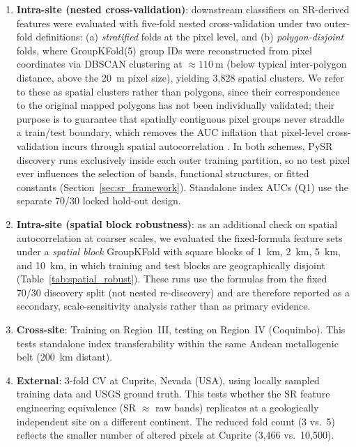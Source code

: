 \documentclass[preprint,authoryear,number]{elsarticle}
\begin{document}
\begin{enumerate}
  \item \textbf{Intra-site (nested cross-validation)}: downstream classifiers on SR-derived features were evaluated with five-fold nested cross-validation under two outer-fold definitions: (a) \emph{stratified} folds at the pixel level, and (b) \emph{polygon-disjoint} folds, where GroupKFold(5) group IDs were reconstructed from pixel coordinates via DBSCAN clustering at $\approx \SI{110}{\meter}$ (below typical inter-polygon distance, above the \SI{20}{\meter} pixel size), yielding 3{,}828 spatial clusters. We refer to these as spatial clusters rather than polygons, since their correspondence to the original mapped polygons has not been individually validated; their purpose is to guarantee that spatially contiguous pixel groups never straddle a train/test boundary, which removes the AUC inflation that pixel-level cross-validation incurs through spatial autocorrelation \citep{Ploton2020,Meyer2019}. In both schemes, PySR discovery runs exclusively inside each outer training partition, so no test pixel ever influences the selection of bands, functional structures, or fitted constants (Section~\ref{sec:sr_framework}). Standalone index AUCs (Q1) use the separate 70/30 locked hold-out design.
  \item \textbf{Intra-site (spatial block robustness)}: as an additional check on spatial autocorrelation at coarser scales, we evaluated the fixed-formula feature sets under a \emph{spatial block} GroupKFold with square blocks of \SI{1}{\kilo\meter}, \SI{2}{\kilo\meter}, \SI{5}{\kilo\meter}, and \SI{10}{\kilo\meter}, in which training and test blocks are geographically disjoint (Table~\ref{tab:spatial_robust}). These runs use the formulas from the fixed 70/30 discovery split (not nested re-discovery) and are therefore reported as a secondary, scale-sensitivity analysis rather than as primary evidence.
  \item \textbf{Cross-site}: Training on Region~III, testing on Region~IV (Coquimbo). This tests standalone index transferability within the same Andean metallogenic belt (\SI{200}{\kilo\meter} distant).
  \item \textbf{External}: 3-fold CV at Cuprite, Nevada (USA), using locally sampled training data and USGS ground truth. This tests whether the SR feature engineering equivalence (SR $\approx$ raw bands) replicates at a geologically independent site on a different continent. The reduced fold count (3 vs.\ 5) reflects the smaller number of altered pixels at Cuprite (3{,}466 vs.\ 10{,}500).
\end{enumerate}
\end{document}
